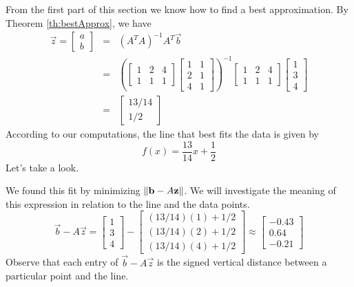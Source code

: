 \documentclass{ximera}
\begin{document}
\begin{exploration}
    From the first part of this section we know how to find a best approximation.  By Theorem \ref{th:bestApprox}, we have
    \begin{eqnarray*}
\vec{z}=\begin{bmatrix}a\\b\end{bmatrix}&=&\left(A^TA\right)^{-1}A^T\vec{b}\\
&=&\left(\begin{bmatrix}1&2&4\\1&1&1\end{bmatrix}\begin{bmatrix}
1&1\\2&1\\4&1\end{bmatrix}\right)^{-1}\begin{bmatrix}1&2&4\\1&1&1\end{bmatrix}\begin{bmatrix}
    1\\3\\4
\end{bmatrix}\\
&=&\begin{bmatrix}13/14\\1/2\end{bmatrix}
\end{eqnarray*}
According to our computations, the line that best fits the data is given by $$f(x)=\frac{13}{14}x+\frac{1}{2}$$
Let's take a look.
\begin{center}
 \end{center}

We found this fit by minimizing $\left\lVert\mathbf{b}-A\mathbf{z}\right\rVert$.  We will investigate the meaning of this expression in relation to the line and the data points.
\begin{equation}
    \vec{b}-A\vec{z}=\begin{bmatrix}1\\3\\4\end{bmatrix}-\begin{bmatrix}(13/14)(1)+1/2\\(13/14)(2)+1/2\\{(13/14)(4)+1/2}\end{bmatrix}\approx\begin{bmatrix}
        -0.43\\0.64\\-0.21
    \end{bmatrix}
\end{equation}
Observe that each entry of $\vec{b}-A\vec{z}$ is the signed vertical distance between a particular point and the line.


\end{exploration}
\end{document}
